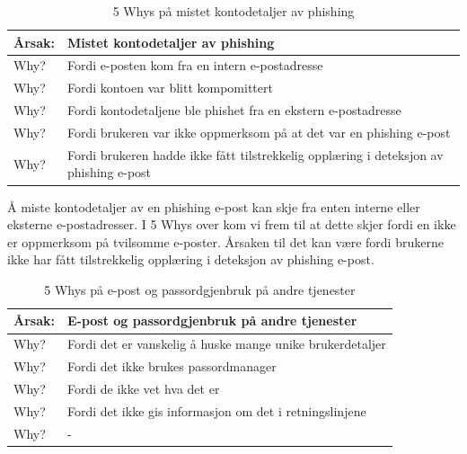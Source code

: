 \begin{table} [H]
    \centering
    \begin{tabular}{ | m{5em} | m{30em} | }
        \hline
            \cellcolor{yellow} Årsak: & \cellcolor{yellow} Mistet kontodetaljer av phishing                \\
        \hline
            Why? & Fordi e-posten kom fra en intern e-postadresse                                   \\
        \hline
            Why? & Fordi kontoen var blitt kompomittert                                             \\
        \hline
            Why? & Fordi kontodetaljene ble phishet fra en ekstern e-postadresse                \\
        \hline
            Why? & Fordi brukeren var ikke oppmerksom på at det var en phishing e-post              \\
        \hline
            Why? & Fordi brukeren hadde ikke fått tilstrekkelig opplæring i deteksjon av phishing e-post    \\
        \hline
    \end{tabular}
    \caption[5 Whys: Mistet kontodetaljer av phishing]{5 Whys på mistet kontodetaljer av phishing}
    \label{5Whys-phishing}
\end{table}

Å miste kontodetaljer av en phishing e-post kan skje fra enten interne eller eksterne e-postadresser. I 5 Whys over kom vi frem til at dette skjer fordi en ikke er oppmerksom på tvilsomme e-poster. Årsaken til det kan være fordi brukerne ikke har fått tilstrekkelig opplæring i deteksjon av phishing e-post.

\begin{table} [H]
    \centering
    \begin{tabular}{ | m{5em} | m{30em} | }
        \hline
            \cellcolor{yellow} Årsak: & \cellcolor{yellow} E-post og passordgjenbruk på andre tjenester \\
        \hline
            Why? & Fordi det er vanskelig å huske mange unike brukerdetaljer \\
        \hline
            Why? & Fordi det ikke brukes passordmanager \\
        \hline
            Why? & Fordi de ikke vet hva det er \\
        \hline
            Why? & Fordi det ikke gis informasjon om det i retningslinjene \\
        \hline
            Why? & - \\
        \hline
    \end{tabular}
    \caption[5 Whys: E-post og passordgjenbruk på andre tjenester]{5 Whys på e-post og passordgjenbruk på andre tjenester}
    \label{5Whys-phishing}
\end{table}

